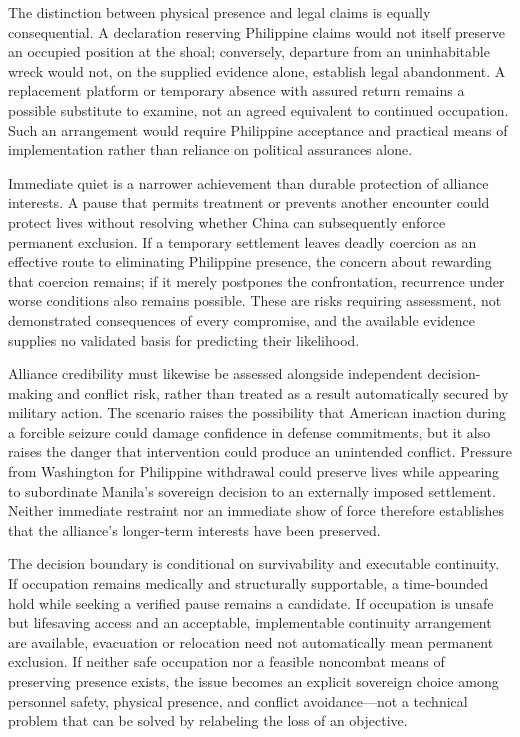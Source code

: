 \documentclass[11pt]{article}
\begin{document}
The distinction between physical presence and legal claims is equally consequential. A declaration reserving Philippine claims would not itself preserve an occupied position at the shoal; conversely, departure from an uninhabitable wreck would not, on the supplied evidence alone, establish legal abandonment. A replacement platform or temporary absence with assured return remains a possible substitute to examine, not an agreed equivalent to continued occupation. Such an arrangement would require Philippine acceptance and practical means of implementation rather than reliance on political assurances alone.

Immediate quiet is a narrower achievement than durable protection of alliance interests. A pause that permits treatment or prevents another encounter could protect lives without resolving whether China can subsequently enforce permanent exclusion. If a temporary settlement leaves deadly coercion as an effective route to eliminating Philippine presence, the concern about rewarding that coercion remains; if it merely postpones the confrontation, recurrence under worse conditions also remains possible. These are risks requiring assessment, not demonstrated consequences of every compromise, and the available evidence supplies no validated basis for predicting their likelihood.

Alliance credibility must likewise be assessed alongside independent decision-making and conflict risk, rather than treated as a result automatically secured by military action. The scenario raises the possibility that American inaction during a forcible seizure could damage confidence in defense commitments, but it also raises the danger that intervention could produce an unintended conflict. Pressure from Washington for Philippine withdrawal could preserve lives while appearing to subordinate Manila’s sovereign decision to an externally imposed settlement. Neither immediate restraint nor an immediate show of force therefore establishes that the alliance’s longer-term interests have been preserved.

The decision boundary is conditional on survivability and executable continuity. If occupation remains medically and structurally supportable, a time-bounded hold while seeking a verified pause remains a candidate. If occupation is unsafe but lifesaving access and an acceptable, implementable continuity arrangement are available, evacuation or relocation need not automatically mean permanent exclusion. If neither safe occupation nor a feasible noncombat means of preserving presence exists, the issue becomes an explicit sovereign choice among personnel safety, physical presence, and conflict avoidance—not a technical problem that can be solved by relabeling the loss of an objective.
\end{document}
